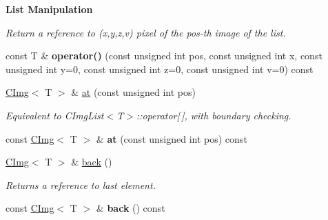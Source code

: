 \begin{Indent}{\bf List Manipulation}
\begin{DoxyCompactItemize}
\begin{DoxyCompactList}\small\item\em Return a reference to (x,y,z,v) pixel of the pos-\/th image of the list. \end{DoxyCompactList}\item 
\hypertarget{structcimg__library_1_1_c_img_list_afa57dba6d9f84a748379dec100baf18d}{const T \& {\bfseries operator()} (const unsigned int pos, const unsigned int x, const unsigned int y=0, const unsigned int z=0, const unsigned int v=0) const }\label{structcimg__library_1_1_c_img_list_afa57dba6d9f84a748379dec100baf18d}

\item 
\hypertarget{structcimg__library_1_1_c_img_list_aa3bc3d47ec85850b2acc5668bfda8005}{\hyperlink{structcimg__library_1_1_c_img}{C\-Img}$<$ T $>$ \& \hyperlink{structcimg__library_1_1_c_img_list_aa3bc3d47ec85850b2acc5668bfda8005}{at} (const unsigned int pos)}\label{structcimg__library_1_1_c_img_list_aa3bc3d47ec85850b2acc5668bfda8005}

\begin{DoxyCompactList}\small\item\em Equivalent to C\-Img\-List$<$\-T$>$\-::operator\mbox{[}$\,$\mbox{]}, with boundary checking. \end{DoxyCompactList}\item 
\hypertarget{structcimg__library_1_1_c_img_list_aa27d47b8d6f17f743137be8725cea7d5}{const \hyperlink{structcimg__library_1_1_c_img}{C\-Img}$<$ T $>$ \& {\bfseries at} (const unsigned int pos) const }\label{structcimg__library_1_1_c_img_list_aa27d47b8d6f17f743137be8725cea7d5}

\item 
\hypertarget{structcimg__library_1_1_c_img_list_af4427aaddc0dd71f674308d931152af5}{\hyperlink{structcimg__library_1_1_c_img}{C\-Img}$<$ T $>$ \& \hyperlink{structcimg__library_1_1_c_img_list_af4427aaddc0dd71f674308d931152af5}{back} ()}\label{structcimg__library_1_1_c_img_list_af4427aaddc0dd71f674308d931152af5}

\begin{DoxyCompactList}\small\item\em Returns a reference to last element. \end{DoxyCompactList}\item 
\hypertarget{structcimg__library_1_1_c_img_list_a97a768dae58235483f815d7f1bb13be3}{const \hyperlink{structcimg__library_1_1_c_img}{C\-Img}$<$ T $>$ \& {\bfseries back} () const }\label{structcimg__library_1_1_c_img_list_a97a768dae58235483f815d7f1bb13be3}


\end{DoxyCompactItemize}
\end{Indent}
